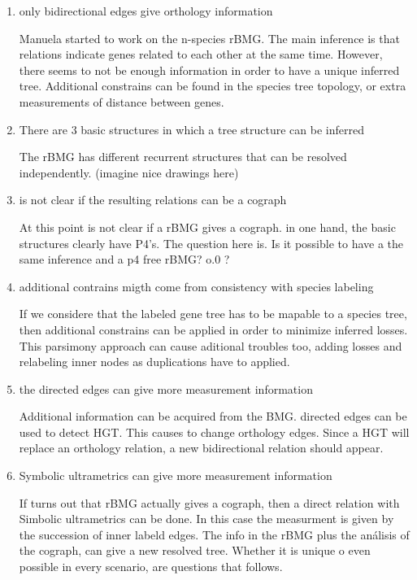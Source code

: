 \documentclass[11pt]{article}
\begin{document}
\begin{enumerate}
\item only bidirectional edges give orthology information

Manuela started to work on the n-species rBMG. The main inference is that relations indicate genes related to each other at the same time. However, there seems to not be enough information in order to have a unique inferred tree. Additional constrains can be found in the species tree topology, or extra measurements of distance between genes.

\item There are 3 basic structures in which a tree structure can be inferred

The rBMG has different recurrent structures that can be resolved independently. (imagine nice drawings here)

\item is not clear if the resulting relations can be a cograph

At this point is not clear if a rBMG gives a cograph. in one hand, the basic structures clearly have P4's. The question here is. Is it possible to have a the same inference and a p4 free rBMG? o.0 ?

\item additional contrains migth come from consistency with species labeling

If we considere that the labeled gene tree has to be mapable to a species tree, then additional constrains can be applied in order to minimize inferred losses.
This parsimony approach can cause aditional troubles too, adding losses and relabeling inner nodes as duplications have to applied.

\item the directed edges can give more measurement information

Additional information can be acquired from the BMG. directed edges can be used to detect HGT. This causes to change orthology edges. Since a HGT will replace an orthology relation, a new bidirectional relation should appear.

\item Symbolic ultrametrics can give more measurement information

If turns out that rBMG actually gives a cograph, then a direct relation with Simbolic ultrametrics can be done.
In this case the measurment is given by the succession of inner labeld edges.
The info in the rBMG plus the análisis of the cograph, can give a new resolved tree. Whether it is unique o even possible in every scenario, are questions that follows.


\end{enumerate}
\end{document}
